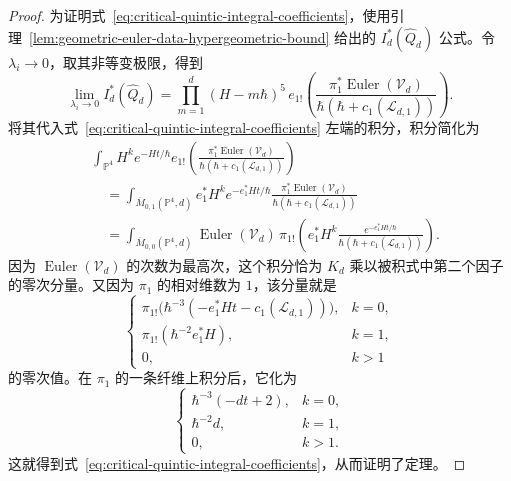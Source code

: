 \begin{proof}
为证明式~\eqref{eq:critical-quintic-integral-coefficients}，使用引理~\ref{lem:geometric-euler-data-hypergeometric-bound} 给出的 $I_d^*(\widehat Q_d)$ 公式。令 $\lambda_i\to0$，取其非等变极限，得到
\[
\lim_{\lambda_i\to0}I_d^*(\widehat Q_d)
=\prod_{m=1}^d(H-m\hbar)^5\,
 e_{1!}\left(\frac{\pi_1^*\operatorname{Euler}(\mathcal V_d)}
 {\hbar(\hbar+c_1(\mathcal L_{d,1}))}\right).
\]
将其代入式~\eqref{eq:critical-quintic-integral-coefficients} 左端的积分，积分简化为
\begin{equation}\label{eq:critical-quintic-pushforward-integral}
\begin{aligned}
&\int_{\mathbb P^4}H^ke^{-Ht/\hbar}
 e_{1!}\left(\frac{\pi_1^*\operatorname{Euler}(\mathcal V_d)}
 {\hbar(\hbar+c_1(\mathcal L_{d,1}))}\right)\\
&\quad=\int_{\overline M_{0,1}(\mathbb P^4,d)}
 e_1^*H^k e^{-e_1^*Ht/\hbar}
 \frac{\pi_1^*\operatorname{Euler}(\mathcal V_d)}{\hbar(\hbar+c_1(\mathcal L_{d,1}))}\\
&\quad=\int_{\overline M_{0,0}(\mathbb P^4,d)}\operatorname{Euler}(\mathcal V_d)\,
 \pi_{1!}\left(e_1^*H^k\frac{e^{-e_1^*Ht/\hbar}}
 {\hbar(\hbar+c_1(\mathcal L_{d,1}))}\right).
\end{aligned}
\end{equation}
因为 $\operatorname{Euler}(\mathcal V_d)$ 的次数为最高次，这个积分恰为 $K_d$ 乘以被积式中第二个因子的零次分量。又因为 $\pi_1$ 的相对维数为 $1$，该分量就是
\[
\begin{cases}
\pi_{1!}\bigl(\hbar^{-3}(-e_1^*Ht-c_1(\mathcal L_{d,1}))\bigr),&k=0,\\
\pi_{1!}(\hbar^{-2}e_1^*H),&k=1,\\
0,&k>1
\end{cases}
\]
的零次值。在 $\pi_1$ 的一条纤维上积分后，它化为
\[
\begin{cases}
\hbar^{-3}(-dt+2),&k=0,\\
\hbar^{-2}d,&k=1,\\
0,&k>1.
\end{cases}
\]
这就得到式~\eqref{eq:critical-quintic-integral-coefficients}，从而证明了定理。
\end{proof}

